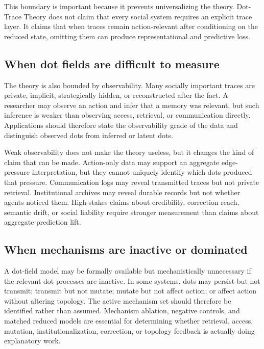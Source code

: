 \documentclass[11pt]{article}
\theoremstyle{remark}
\begin{document}
This boundary is important because it prevents universalizing the theory. Dot-Trace Theory does not claim that every social system requires an explicit trace layer. It claims that when traces remain action-relevant after conditioning on the reduced state, omitting them can produce representational and predictive loss.

\subsection{When dot fields are difficult to measure}\label{boundary-measurement-limits}

The theory is also bounded by observability. Many socially important traces are private, implicit, strategically hidden, or reconstructed after the fact. A researcher may observe an action and infer that a memory was relevant, but such inference is weaker than observing access, retrieval, or communication directly. Applications should therefore state the observability grade of the data and distinguish observed dots from inferred or latent dots.

Weak observability does not make the theory useless, but it changes the kind of claim that can be made. Action-only data may support an aggregate edge-pressure interpretation, but they cannot uniquely identify which dots produced that pressure. Communication logs may reveal transmitted traces but not private retrieval. Institutional archives may reveal durable records but not whether agents noticed them. High-stakes claims about credibility, correction reach, semantic drift, or social liability require stronger measurement than claims about aggregate prediction lift.

\subsection{When mechanisms are inactive or dominated}\label{boundary-mechanism-limits}

A dot-field model may be formally available but mechanistically unnecessary if the relevant dot processes are inactive. In some systems, dots may persist but not transmit; transmit but not mutate; mutate but not affect action; or affect action without altering topology. The active mechanism set should therefore be identified rather than assumed. Mechanism ablation, negative controls, and matched reduced models are essential for determining whether retrieval, access, mutation, institutionalization, correction, or topology feedback is actually doing explanatory work.
\end{document}
